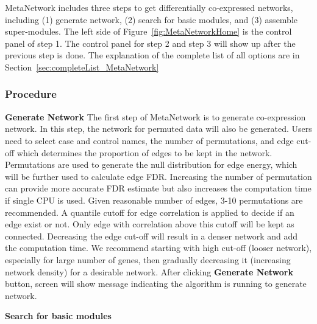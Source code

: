 MetaNetwork includes three steps to get differentially co-expressed networks,
including (1) generate network, (2) search for basic modules, and (3) assemble super-modules. 
The left side of Figure~\ref{fig:MetaNetworkHome} is the control panel of step 1. 
The control panel for step 2 and step 3 will show up after the previous step is done.
The explanation of the complete list of all options are in Section~\ref{sec:completeList_MetaNetwork}


\subsubsection{Procedure}

\begin{steps}
\item \textbf{Generate Network}
The first step of MetaNetwork is to generate co-expression network. 
In this step, the network for permuted data will also be generated. 
Users need to select case and control names, the number of permutations, and edge cut-off which determines the proportion of edges to be kept in the network. 
Permutations are used to generate the null distribution for edge energy, 
which will be further used to calculate edge FDR. 
Increasing the number of permutation can provide more accurate FDR estimate but also increases the computation time if single CPU is used. 
Given reasonable number of edges, 3-10 permutations are recommended.
A quantile cutoff for edge correlation is applied to decide if an edge exist or not. 
Only edge with correlation above this cutoff will be kept as connected. 
Decreasing the edge cut-off will result in a denser network and add the computation time. 
We recommend starting with high cut-off (looser network), 
especially for large number of genes, then gradually decreasing it (increasing network density) for a desirable network.
After clicking \textbf{Generate Network} button, screen will show message indicating the algorithm is running to generate network.

\item \textbf{Search for basic modules}


\end{steps}
